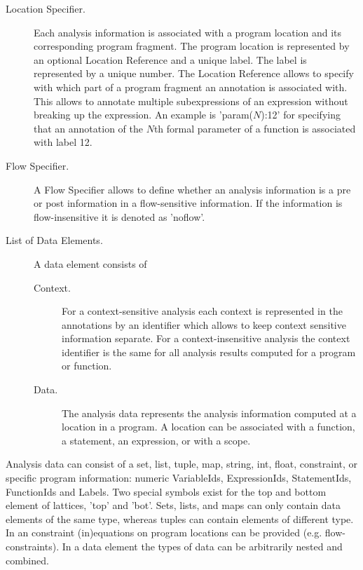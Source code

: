\documentclass[a4paper,12pt]{report}
\begin{document}
\begin{description}
\begin{description}
\begin{description}
\item [Location Specifier.] Each analysis information is associated with a
program location and its corresponding program fragment. The program
location is represented by an optional Location Reference and a unique
label. The label is represented by a unique number.
The Location Reference allows to specify with which
part of a program fragment an annotation is associated with. This allows to
annotate multiple subexpressions of an expression without breaking up
the expression. An example is 'param($N$):12' for specifying that an annotation
of the $N$th formal parameter of a function is associated with label 12.

\item [Flow Specifier.] A Flow Specifier allows to define whether an analysis information is a pre or post information in a flow-sensitive information. If the information is flow-insensitive it is denoted as 'noflow'.
\item [List of Data Elements.] A data element consists of
\begin{description}
\item [Context.] For a context-sensitive analysis each context is represented in the annotations by an identifier which allows to keep context sensitive information separate. For a context-insensitive analysis the context identifier is the same for all analysis results computed for a program or function.
\item [Data.] The analysis data represents the analysis
information computed at a location in a program. A location can be
associated with a function, a statement, an expression, or with a scope.
\end{description}
\end{description}
\end{description}

Analysis data can consist of a set, list, tuple, map, string, int, float,
constraint, or specific program information: numeric VariableIds,
ExpressionIds, StatementIds, FunctionIds and Labels. Two special
symbols exist for the top and bottom element of lattices, 'top' and 'bot'. Sets, lists,
and maps can only contain data elements of the same type, whereas
tuples can contain elements of different type. In an constraint
(in)equations on program locations can be provided
(e.g. flow-constraints). In a data element the types of data can be
arbitrarily nested and combined.
\end{description}
\end{document}
